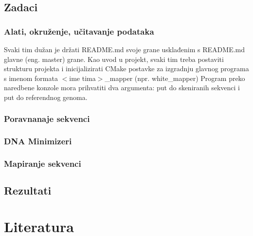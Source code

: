 \documentclass[times, 12pt, utf8]{article}
\begin{document}
    \subsection{Zadaci}
        \subsubsection{Alati, okruženje, učitavanje podataka}
            Svaki tim dužan je držati README.md svoje grane usklađenim 
            s README.md glavne (eng. master) grane. Kao uvod u projekt,
            svaki tim treba postaviti strukturu projekta i inicijalizirati
            CMake postavke za izgradnju glavnog programa s imenom formata 
            \colorbox{gray!30}{$<$ime tima$>$\_mapper} (npr. \colorbox{gray!30}{white\_mapper})
            Program preko naredbene konzole mora prihvatiti dva argumenta:
            put do skeniranih sekvenci i put do referendnog genoma.



        \subsubsection{Poravnanaje sekvenci}
        \subsubsection{DNA Minimizeri}
        \subsubsection{Mapiranje sekvenci}

\subsection{Rezultati}

\section{Literatura}

\end{document}

